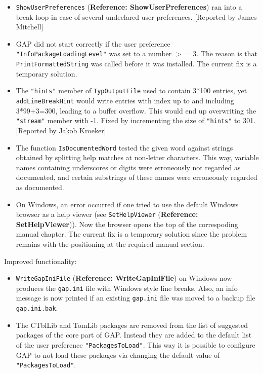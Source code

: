 \documentclass[a4paper,11pt]{report}
\begin{document}
{{\begin{itemize}
situations by setting \texttt{rl{\textunderscore}event{\textunderscore}hook} only if \texttt{OnCharReadHookActive} is set. 
\item  \texttt{ShowUserPreferences} (\textbf{Reference: ShowUserPreferences}) ran into a break loop in case of several undeclared user preferences.
[Reported by James Mitchell] 
\item  \textsf{GAP} did not start correctly if the user preference \texttt{"InfoPackageLoadingLevel"} was set to a number $ >= 3$. The reason is that \texttt{PrintFormattedString} was called before it was installed. The current fix is a temporary solution. 
\item  The \texttt{"hints"} member of \texttt{TypOutputFile} used to contain 3*100 entries, yet \texttt{addLineBreakHint} would write entries with index up to and including 3*99+3=300, leading to a
buffer overflow. This would end up overwriting the \texttt{"stream"} member with -1. Fixed by incrementing the size of \texttt{"hints"} to 301. [Reported by Jakob Kroeker] 
\item  The function \texttt{IsDocumentedWord} tested the given word against strings obtained by splitting help matches at
non-letter characters. This way, variable names containing underscores or
digits were erroneously not regarded as documented, and certain substrings of
these names were erroneously regarded as documented. 
\item  On Windows, an error occurred if one tried to use the default Windows browser
as a help viewer (see \texttt{SetHelpViewer} (\textbf{Reference: SetHelpViewer})). Now the browser opens the top of the correspoding manual chapter. The
current fix is a temporary solution since the problem remains with the
positioning at the required manual section. 
\end{itemize}
 Improved functionality: 
\begin{itemize}
\item  \texttt{WriteGapIniFile} (\textbf{Reference: WriteGapIniFile}) on Windows now produces the \texttt{gap.ini} file with Windows style line breaks. Also, an info message is now printed if
an existing \texttt{gap.ini} file was moved to a backup file \texttt{gap.ini.bak}. 
\item  The \textsf{CTblLib} and \textsf{TomLib} packages are removed from the list of suggested packages of the core part of \textsf{GAP}. Instead they are added to the default list of the user preference \texttt{"PackagesToLoad"}. This way it is possible to configure \textsf{GAP} to not load these packages via changing the default value of \texttt{"PackagesToLoad"}. 

\end{itemize}}}
\end{document}
